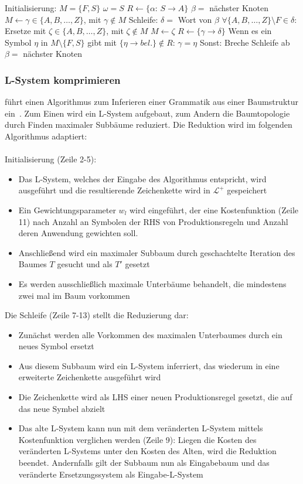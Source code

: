 \begin{algorithm}[caption={Inferieren eines L-Systems aus einer Baumstruktur}, label={alg2}]
    Initialisierung:
    $M=\{F,S\}$
    $\omega=S$
    $R \gets \{\alpha$: $S \rightarrow A\}$
    $\beta=$ nächster Knoten
    $M \gets \gamma \in \{A,B,\dots,Z\}$, mit $\gamma \notin M$
    Schleife:
    $\delta=$ Wort von $\beta$
    $\forall \{A,B,\dots,Z\} \setminus F \in \delta:$
    Ersetze mit $\zeta \in \{A,B,\dots,Z\}$, mit $\zeta \notin M$
    $M \gets \zeta$
    $R \gets \{\gamma\rightarrow\delta\}$
    Wenn es ein Symbol $\eta$ in $M\setminus\{F,S\}$ gibt mit $\{\eta \rightarrow bel.\} \notin R$:
    $\gamma=\eta$
    Sonst:
    Breche Schleife ab
    $\beta=$ nächster Knoten
\end{algorithm}

\subsubsection*{L-System komprimieren}
\citeauthor{guo_2020} führt einen Algorithmus zum Inferieren einer Grammatik aus einer Baumstruktur ein~\cite{guo_2020}.
Zum Einen wird ein L-System aufgebaut, zum Andern die Baumtopologie durch Finden maximaler Subbäume reduziert.
Die Reduktion wird im folgenden Algorithmus adaptiert:\\~\\
Initialisierung (Zeile 2-5):
\begin{itemize}
    \item Das L-System, welches der Eingabe des Algorithmus entspricht, wird ausgeführt und
    die resultierende Zeichenkette wird in $\mathcal{L^+}$ gespeichert
    \item Ein Gewichtungsparameter $w_l$ wird eingeführt, der eine Kostenfunktion (Zeile 11) nach Anzahl an Symbolen
    der RHS von Produktionsregeln und Anzahl deren Anwendung gewichten soll.
    \item Anschließend wird ein maximaler Subbaum durch geschachtelte Iteration des Baumes $T$ gesucht und als $T'$ gesetzt
    \item Es werden ausschließlich maximale Unterbäume behandelt, die mindestens zwei mal im Baum vorkommen
\end{itemize}
Die Schleife (Zeile 7-13) stellt die Reduzierung dar:
\begin{itemize}
    \item Zunächst werden alle Vorkommen des maximalen Unterbaumes durch ein neues Symbol ersetzt
    \item Aus diesem Subbaum wird ein L-System inferriert, das wiederum in eine erweiterte Zeichenkette ausgeführt wird
    \item Die Zeichenkette wird als LHS einer neuen Produktionsregel gesetzt, die auf das neue Symbel abzielt
    \item Das alte L-System kann nun mit dem veränderten L-System mittels Kostenfunktion verglichen werden (Zeile 9):
    Liegen die Kosten des veränderten L-Systems unter den Kosten des Alten, wird die Reduktion beendet.
    Andernfalls gilt der Subbaum nun als Eingabebaum und das veränderte Ersetzungssystem als Eingabe-L-System
\end{itemize}


